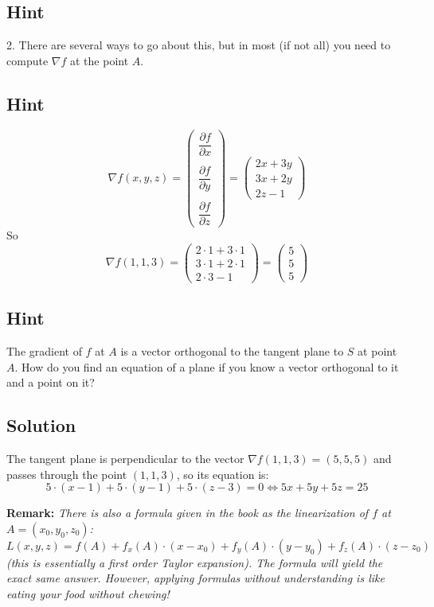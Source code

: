 \documentclass[a4paper,10pt]{article}
\begin{document}
\subsection{Hint}
2. There are several ways to go about this, but in most (if not all) you need to compute $\nabla f$ at the point $A$.

\subsection{Hint}
\[
    \nabla f(x,y,z) = \begin{pmatrix}
        \dfrac{\partial f}{\partial x} \\ \\ \dfrac{\partial f}{\partial y} \\ \\ \dfrac{\partial f}{\partial z}
    \end{pmatrix} = \begin{pmatrix}
        2x+3y \\ 3x+2y \\ 2z-1
    \end{pmatrix}
\]
So
\[
    \nabla f(1,1,3) = \begin{pmatrix}
        2\cdot 1+3\cdot 1 \\ 3\cdot 1+2\cdot 1 \\ 2\cdot 3-1
    \end{pmatrix} = \begin{pmatrix}
        5 \\ 5 \\ 5
    \end{pmatrix}
\]

\subsection{Hint}
The gradient of $f$ at $A$ is a vector orthogonal to the tangent plane to $S$ at point $A$. How do you find an equation of a plane if you know a vector orthogonal to it and a point on it?

\subsection{Solution}
The tangent plane is perpendicular to the vector $\nabla f(1, 1, 3) = (5, 5, 5)$ and passes through the point $(1, 1, 3)$, so its equation is:
\[
    5\cdot(x-1) + 5\cdot (y-1) + 5 \cdot (z-3) = 0 \iff 5x+5y+5z = 25
\]

\textbf{Remark:} \emph{There is also a formula given in the book as the linearization of $f$ at $A = (x_0, y_0, z_0)$:
\[
    L(x,y,z) = f(A) + f_x(A)\cdot (x - x_0) + f_y(A)\cdot (y - y_0) + f_z(A)\cdot (z - z_0)
\]
(this is essentially a first order Taylor expansion). The formula will yield the exact same answer. However, applying formulas without understanding is like eating your food without chewing!}
\end{document}
